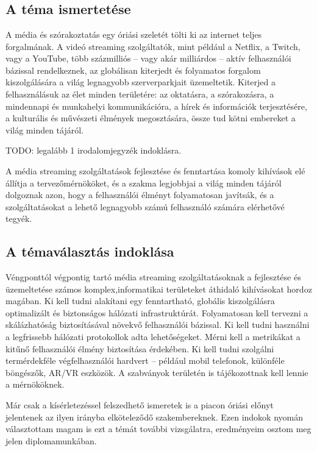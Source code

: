\chapter{\bevezetes}

\section{A téma ismertetése}

A média és szórakoztatás egy óriási szeletét tölti ki az internet teljes forgalmának. A videó streaming szolgáltatók, mint például a Netflix, a Twitch, vagy a YouTube, több százmilliós -- vagy akár milliárdos -- aktív felhasználói bázissal rendelkeznek, az globálisan kiterjedt és folyamatos forgalom kiszolgálására a világ legnagyobb szerverparkjait üzemeltetik. Kiterjed a felhasználásuk az élet minden területére: az oktatásra, a szórakozásra, a mindennapi és munkahelyi kommunikációra, a hírek és információk terjesztésére, a kulturális és művészeti élmények megosztására, össze tud kötni embereket a világ minden tájáról.

TODO: legalább 1 irodalomjegyzék indoklásra.

A média streaming szolgáltatások fejlesztése és fenntartása komoly kihívások elé állítja a tervezőmérnököket, és a szakma legjobbjai a világ minden tájáról dolgoznak azon, hogy a felhasználói élményt folyamatosan javítsák, és a szolgáltatásokat a lehető legnagyobb számú felhasználó számára elérhetővé tegyék.

\section{A témaválasztás indoklása}

Véngponttól végpontig tartó média streaming szolgáltatásoknak a fejlesztése és üzemeltetése számos komplex,informatikai területeket áthidaló kihívásokat hordoz magában. Ki kell tudni alakítani egy fenntartható, globális kiszolgálásra optimalizált és biztonságos hálózati infrastruktúrát. Folyamatosan kell tervezni a skálázhatóság biztosításával növekvő felhasználói bázissal. Ki kell tudni használni a legfrissebb hálózati protokollok adta lehetőségeket. Mérni kell a metrikákat a kitűnő felhasználói élmény biztosítása érdekében. Ki kell tudni szolgálni termérdekféle végfelhasználói hardvert -- például mobil telefonok, különféle böngészők, AR/VR eszközök. A szabványok területén is tájékozottnak kell lennie a mérnököknek.

Már csak a kísérletezéssel felszedhető ismeretek is a piacon óriási előnyt jelentenek az ilyen irányba elköteleződő szakembereknek. Ezen indokok nyomán választottam magam is ezt a témát további vizsgálatra, eredményeim osztom meg jelen diplomamunkában.

